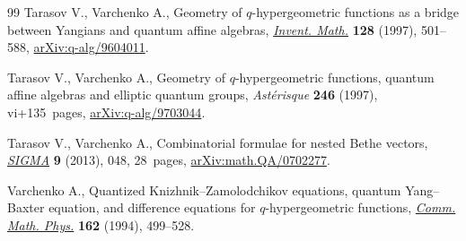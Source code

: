 \begin{thebibliography}{99}
Tarasov V., Varchenko A., Geometry of {$q$}-hypergeometric functions as a
 bridge between {Y}angians and quantum affine algebras, \href{https://doi.org/10.1007/s002220050151}{\textit{Invent. Math.}}
 \textbf{128} (1997), 501--588, \href{https://arxiv.org/abs/q-alg/9604011}{arXiv:q-alg/9604011}.

Tarasov V., Varchenko A., Geometry of {$q$}-hypergeometric functions, quantum
 affine algebras and elliptic quantum groups, \textit{Ast\'{e}risque}
 \textbf{246} (1997), vi+135~pages, \href{https://arxiv.org/abs/q-alg/9703044}{arXiv:q-alg/9703044}.

Tarasov V., Varchenko A., Combinatorial formulae for nested {B}ethe vectors,
 \href{https://doi.org/10.3842/SIGMA.2013.048}{\textit{SIGMA}} \textbf{9} (2013), 048, 28~pages, \href{https://arxiv.org/abs/math.QA/0702277}{arXiv:math.QA/0702277}.

Varchenko A., Quantized {K}nizhnik--{Z}amolodchikov equations, quantum
 {Y}ang--{B}axter equation, and dif\-fe\-rence equations for {$q$}-hypergeometric
 functions, \href{https://doi.org/10.1007/BF02101745}{\textit{Comm. Math. Phys.}} \textbf{162} (1994), 499--528.

\end{thebibliography}
